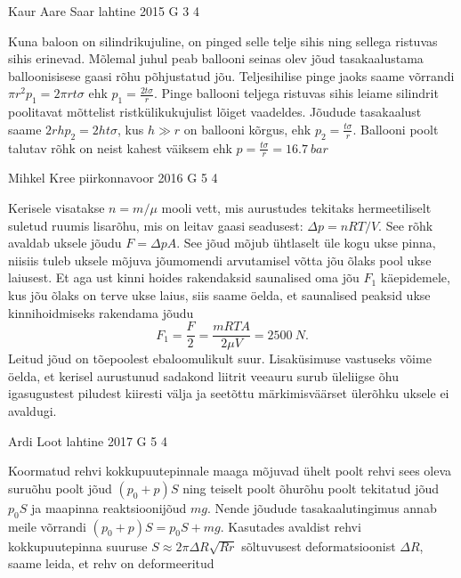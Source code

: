 \documentclass[11pt, twoside]{article}
\begin{document}
{%
{Kaur Aare Saar} %
{lahtine} %
{2015} %
{G 3} %
{4} %
{

\ifSolution
Kuna baloon on silindrikujuline, on pinged selle telje sihis ning sellega ristuvas sihis erinevad. Mõlemal juhul peab ballooni seinas olev jõud tasakaalustama balloonisisese gaasi rõhu põhjustatud jõu. Teljesihilise pinge jaoks saame võrrandi $\pi r^2 p_1=2\pi rt\sigma$ ehk $p_1=\frac{2t\sigma}{r}$. Pinge ballooni teljega ristuvas sihis leiame silindrit poolitavat mõttelist ristkülikukujulist lõiget vaadeldes. Jõudude tasakaalust saame $2rhp_2=2ht\sigma$, kus $h\gg r$ on ballooni kõrgus, ehk $p_2=\frac{t\sigma}{r}$. Ballooni poolt talutav rõhk on neist kahest väiksem ehk $p=\frac{t\sigma}{r}=\SI{16,7}{bar}$
\fi
}

{Mihkel Kree} %
{piirkonnavoor} %
{2016} %
{G 5} %
{4} %
{

\ifSolution
Kerisele visatakse $n=m/\mu$ mooli vett, mis aurustudes tekitaks hermeetiliselt suletud ruumis lisarõhu, mis on leitav gaasi seadusest: $\Delta p = nRT/V$. See rõhk avaldab uksele jõudu $F=\Delta p A$. See jõud mõjub ühtlaselt üle kogu ukse pinna, niisiis tuleb uksele mõjuva jõumomendi arvutamisel võtta jõu õlaks pool ukse laiusest. Et aga ust kinni hoides rakendaksid saunalised oma jõu $F_1$ käepidemele, kus jõu õlaks on terve ukse laius, siis saame öelda, et saunalised peaksid ukse kinnihoidmiseks rakendama jõudu
\[F_1 = \frac{F}{2} = \frac{mRTA}{2 \mu V} = \SI{2500}{N}.\]
Leitud jõud on tõepoolest ebaloomulikult suur. Lisaküsimuse vastuseks võime öelda, et kerisel aurustunud sadakond liitrit veeauru surub üleliigse õhu igasugustest piludest kiiresti välja ja seetõttu märkimisväärset ülerõhku uksele ei avaldugi.
\fi
}

{Ardi Loot} %
{lahtine} %
{2017} %
{G 5} %
{4} %
{

\ifSolution
Koormatud rehvi kokkupuutepinnale maaga mõjuvad ühelt poolt rehvi sees oleva suruõhu poolt jõud $\left(p_{0}+p\right)S$ ning teiselt
poolt õhurõhu poolt tekitatud jõud $p_{0}S$ ja maapinna reaktsioonijõud $mg$. Nende jõudude tasakaalutingimus annab meile võrrandi $\left(p_{0}+p\right)S=p_{0}S+mg.$ Kasutades avaldist rehvi kokkupuutepinna suuruse $S\approx2\pi\Delta R\sqrt{Rr}$ sõltuvusest deformatsioonist $\Delta R$, saame leida, et rehv on deformeeritud

}}
\end{document}
